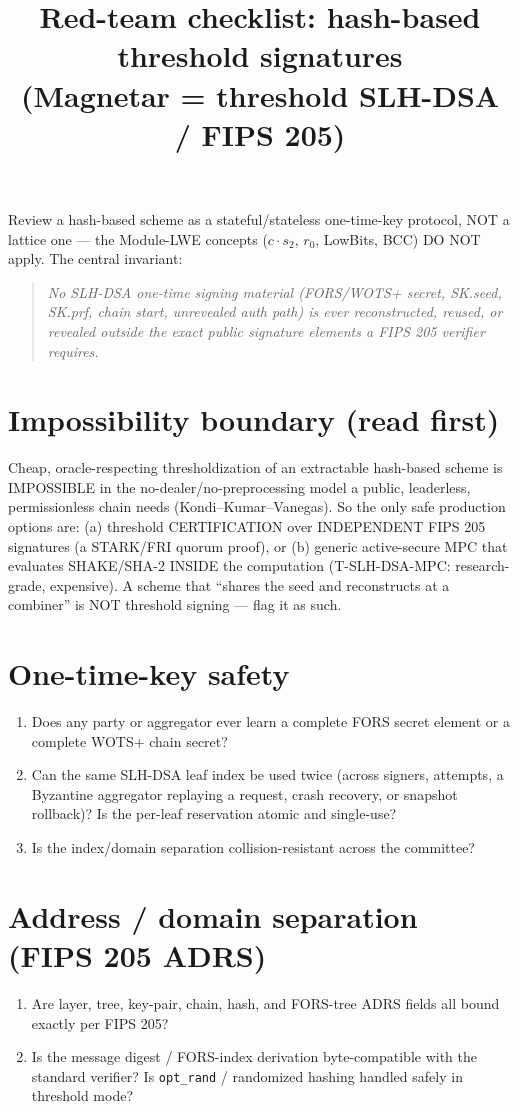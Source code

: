\documentclass[11pt]{article}
\title{Red-team checklist: hash-based threshold signatures\\(Magnetar = threshold SLH-DSA / FIPS 205)}
\date{}
\begin{document}
\maketitle
\noindent Review a hash-based scheme as a stateful/stateless one-time-key
protocol, NOT a lattice one --- the Module-LWE concepts ($c\!\cdot\!s_2$,
$r_0$, LowBits, BCC) DO NOT apply. The central invariant:

\begin{quote}\itshape No SLH-DSA one-time signing material (FORS/WOTS+ secret,
SK.seed, SK.prf, chain start, unrevealed auth path) is ever reconstructed,
reused, or revealed outside the exact public signature elements a FIPS 205
verifier requires.\end{quote}

\section{Impossibility boundary (read first)}
Cheap, oracle-respecting thresholdization of an extractable hash-based scheme
is IMPOSSIBLE in the no-dealer/no-preprocessing model a public, leaderless,
permissionless chain needs (Kondi--Kumar--Vanegas). So the only safe
production options are: (a) threshold CERTIFICATION over INDEPENDENT FIPS 205
signatures (a STARK/FRI quorum proof), or (b) generic active-secure MPC that
evaluates SHAKE/SHA-2 INSIDE the computation (T-SLH-DSA-MPC: research-grade,
expensive). A scheme that ``shares the seed and reconstructs at a combiner'' is
NOT threshold signing --- flag it as such.

\section{One-time-key safety}
\begin{enumerate}[leftmargin=*]
  \item Does any party or aggregator ever learn a complete FORS secret element
    or a complete WOTS+ chain secret?
  \item Can the same SLH-DSA leaf index be used twice (across signers, attempts,
    a Byzantine aggregator replaying a request, crash recovery, or snapshot
    rollback)? Is the per-leaf reservation atomic and single-use?
  \item Is the index/domain separation collision-resistant across the committee?
\end{enumerate}

\section{Address / domain separation (FIPS 205 ADRS)}
\begin{enumerate}[leftmargin=*]
  \item Are layer, tree, key-pair, chain, hash, and FORS-tree ADRS fields all
    bound exactly per FIPS 205?
  \item Is the message digest / FORS-index derivation byte-compatible with the
    standard verifier? Is \texttt{opt\_rand} / randomized hashing handled
    safely in threshold mode?
\end{enumerate}
\end{document}
